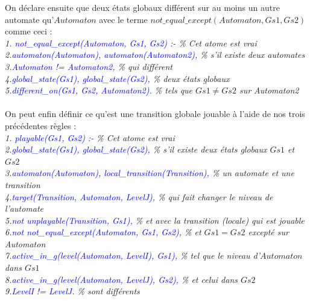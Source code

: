 \documentclass[12pt,a4paper]{article}
\begin{document}
On déclare ensuite que deux états globaux différent sur au moins un autre automate qu'$Automaton$ avec le terme $not\_equal\_except(Automaton, Gs1, Gs2)$ comme ceci :\\
\emph{
1. \textcolor{blue}{not\_equal\_except(Automaton, Gs1, Gs2) :-} \% Cet atome est vrai\\
2.\qquad \textcolor{blue}{automaton(Automaton), automaton(Automaton2),} \% s'il existe deux automates\\
3.\qquad \textcolor{blue}{Automaton != Automaton2,} \% qui différent\\
4.\qquad \textcolor{blue}{global\_state(Gs1), global\_state(Gs2),} \% deux états globaux\\
5.\qquad \textcolor{blue}{different\_on(Gs1, Gs2, Automaton2).} \% tels que $Gs1 \neq Gs2$ sur Automaton2\\ \\
}
On peut enfin définir ce qu'est une transition globale jouable à l'aide de nos trois précédentes règles :\\
\emph{
1. \textcolor{blue}{playable(Gs1, Gs2) :-} \% Cet atome est vrai\\
2.\qquad \textcolor{blue}{global\_state(Gs1), global\_state(Gs2),} \% s'il existe deux états globaux $Gs1$ et $Gs2$\\
3.\qquad \textcolor{blue}{automaton(Automaton), local\_transition(Transition),} \% un automate et une transition\\
4.\qquad \textcolor{blue}{target(Transition, Automaton, LevelJ),} \% qui fait changer le niveau de l'automate\\
5.\qquad \textcolor{blue}{not unplayable(Transition, Gs1),} \% et avec la transition (locale) qui est jouable\\
6.\qquad \textcolor{blue}{not not\_equal\_except(Automaton, Gs1, Gs2),} \% et $Gs1=Gs2$ excepté sur Automaton\\
7.\qquad \textcolor{blue}{active\_in\_g(level(Automaton, LevelI), Gs1),} \% tel que le niveau d'$Automaton$ dans $Gs1$\\
8.\qquad \textcolor{blue}{active\_in\_g(level(Automaton, LevelJ), Gs2),} \% et celui dans $Gs2$\\
9.\qquad \textcolor{blue}{LevelI != LevelJ.} \% sont différents\\
}
\end{document}
